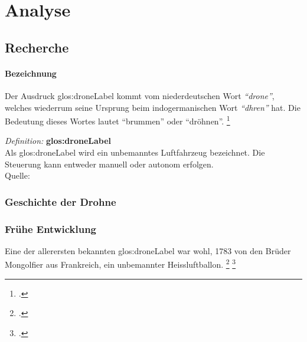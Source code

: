 \chapter{Analyse}

\section{Recherche}

\subsubsection{Bezeichnung}
Der Ausdruck \gls{glos:droneLabel} kommt vom niederdeutschen Wort \textit{"`drone"'}, welches wiederrum seine Ursprung beim indogermanischen Wort \textit{"`dhren"'} hat. Die Bedeutung dieses Wortes lautet "`brummen"' oder "`dröhnen"'. \footcite{Geschichte_der_Drohne_-_Nachrichten_Print_-_DIE_WELT_-_Wissen_Print_DW_-_DIE_WELT_2015-03-21}

\begin{framed}
	\textit{Definition: }\textbf{\gls{glos:droneLabel}}\\
	Als \gls{glos:droneLabel} wird ein unbemanntes Luftfahrzeug bezeichnet. Die Steuerung kann entweder manuell oder autonom erfolgen.\\
	Quelle: 
	\cite{Drone_Define_Drone_at_Dictionary.com_2015-03-21}
\end{framed}

\subsection{Geschichte der Drohne}

\subsection{Frühe Entwicklung}
Eine der allerersten bekannten \gls{glos:droneLabel} war wohl, 1783 von den Brüder Mongolfier aus Frankreich, ein unbemannter Heissluftballon. \footcite{Kleine_Geschichte_der_Drohnen_-_Nachrichten_Print_-_WELT_KOMPAKT_-_Lifestyle_-_DIE_WELT_2015-03-21}
\footcite{Unbemannte_Luftfahrt__Wikipedia_2015-03-22}

